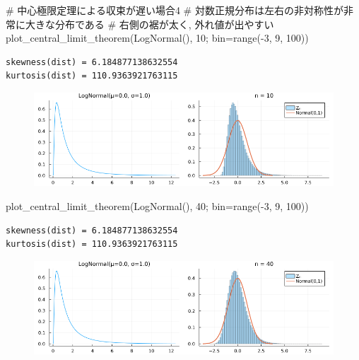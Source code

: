 \documentclass[
  letterpaper,
  DIV=11,
  numbers=noendperiod]{scrartcl}
\newenvironment{Shaded}{\begin{snugshade}}{\end{snugshade}}
\newcommand{\CommentTok}[1]{\textcolor[rgb]{0.37,0.37,0.37}{#1}}
\newcommand{\FloatTok}[1]{\textcolor[rgb]{0.68,0.00,0.00}{#1}}
\newcommand{\FunctionTok}[1]{\textcolor[rgb]{0.28,0.35,0.67}{#1}}
\newcommand{\NormalTok}[1]{\textcolor[rgb]{0.00,0.23,0.31}{#1}}
\newcommand{\OperatorTok}[1]{\textcolor[rgb]{0.37,0.37,0.37}{#1}}
\begin{document}
\begin{Shaded}
\begin{Highlighting}[]
\CommentTok{\# 中心極限定理による収束が遅い場合4}
\CommentTok{\# 対数正規分布は左右の非対称性が非常に大きな分布である}
\CommentTok{\# 右側の裾が太く, 外れ値が出やすい}
\FunctionTok{plot\_central\_limit\_theorem}\NormalTok{(}\FunctionTok{LogNormal}\NormalTok{(), }\FloatTok{10}\NormalTok{; bin}\OperatorTok{=}\FunctionTok{range}\NormalTok{(}\OperatorTok{{-}}\FloatTok{3}\NormalTok{, }\FloatTok{9}\NormalTok{, }\FloatTok{100}\NormalTok{))}
\end{Highlighting}
\end{Shaded}

\begin{verbatim}
skewness(dist) = 6.184877138632554
kurtosis(dist) = 110.9363921763115
\end{verbatim}

\begin{figure}[H]

{\centering \includegraphics{05 Central limit theorem_files/figure-pdf/cell-90-output-2.png}

}

\end{figure}

\begin{Shaded}
\begin{Highlighting}[]
\FunctionTok{plot\_central\_limit\_theorem}\NormalTok{(}\FunctionTok{LogNormal}\NormalTok{(), }\FloatTok{40}\NormalTok{; bin}\OperatorTok{=}\FunctionTok{range}\NormalTok{(}\OperatorTok{{-}}\FloatTok{3}\NormalTok{, }\FloatTok{9}\NormalTok{, }\FloatTok{100}\NormalTok{))}
\end{Highlighting}
\end{Shaded}

\begin{verbatim}
skewness(dist) = 6.184877138632554
kurtosis(dist) = 110.9363921763115
\end{verbatim}

\begin{figure}[H]

{\centering \includegraphics{05 Central limit theorem_files/figure-pdf/cell-91-output-2.png}

}

\end{figure}
\end{document}
